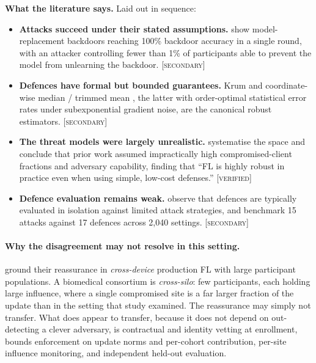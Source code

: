 \documentclass[11pt,a4paper]{article}
\newcommand{\verified}{\textsc{[verified]}}
\newcommand{\secondary}{\textsc{[secondary]}}
\newcommand{\evidence}[1]{\par\smallskip\noindent\textbf{What the literature says.} #1}
\begin{document}
\evidence{Laid out in sequence:

\begin{itemize}
  \item \textbf{Attacks succeed under their stated assumptions.}
  \citet{bagdasaryan2020backdoor} show model-replacement backdoors reaching
  100\% backdoor accuracy in a single round, with an attacker controlling
  fewer than 1\% of participants able to prevent the model from unlearning
  the backdoor. \secondary

  \item \textbf{Defences have formal but bounded guarantees.} Krum
  \citep{blanchard2017machine} and coordinate-wise median / trimmed mean
  \citep{yin2018byzantine}, the latter with order-optimal statistical error
  rates under subexponential gradient noise, are the canonical robust
  estimators. \secondary

  \item \textbf{The threat models were largely unrealistic.}
  \citet{shejwalkar2022back} systematise the space and conclude that prior
  work assumed impractically high compromised-client fractions and adversary
  capability, finding that ``FL is highly robust in practice even when using
  simple, low-cost defenses.'' \verified

  \item \textbf{Defence evaluation remains weak.}
  \citet{sok2025benchmarking} observe that defences are typically evaluated
  in isolation against limited attack strategies, and benchmark 15 attacks
  against 17 defences across 2,040 settings. \secondary
\end{itemize}}

\paragraph{Why the disagreement may not resolve in this setting.}
\citet{shejwalkar2022back} ground their reassurance in \emph{cross-device}
production FL with large participant populations. A biomedical consortium is
\emph{cross-silo}: few participants, each holding large influence, where a
single compromised site is a far larger fraction of the update than in the
setting that study examined. The reassurance may simply not transfer. What
does appear to transfer, because it does not depend on out-detecting a
clever adversary, is contractual and identity vetting at enrollment, bounds
enforcement on update norms and per-cohort contribution, per-site influence
monitoring, and independent held-out evaluation.
\end{document}
